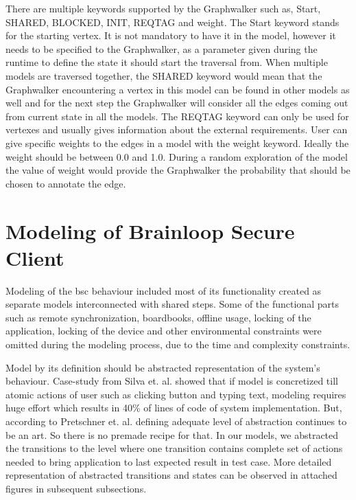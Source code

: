 \par
There are multiple keywords supported by the Graphwalker such as, Start, SHARED, BLOCKED, INIT, REQTAG and weight. The Start keyword stands for the starting vertex. It is not mandatory to have it in the model, however it needs to be specified to the Graphwalker, as a parameter given during the runtime to define the state it should start the traversal from. When multiple models are traversed together, the SHARED keyword would mean that the Graphwalker encountering a vertex in this model can be found in other models as well and for the next step the Graphwalker will consider all the edges coming out from current state in all the models. The REQTAG keyword can only be used for vertexes and usually gives information about the external requirements. User can give specific weights to the edges in a model with the weight keyword. Ideally the weight should be between 0.0 and 1.0. During a random exploration of the model the value of weight would provide the Graphwalker the probability that should be chosen to annotate the edge.

\section{Modeling of Brainloop Secure Client}

\par
Modeling of the \acrshort{bsc} behaviour included  most of its functionality created as separate models interconnected with shared steps. Some of the functional parts such as remote synchronization, boardbooks, offline usage, locking of the application, locking of the device and other environmental constraints were omitted during the modeling process, due to the time and complexity constraints.

\par
Model by its definition should be abstracted representation of the system's behaviour.
Case-study from Silva et. al. \cite{Silva_SpecExplorer} showed that if model is concretized till atomic actions of user such as clicking button and typing text, modeling requires huge effort which results in 40\% of lines of code of system implementation. But, according to Pretschner et. al. \cite{Pretschner_MBTInPractice} defining adequate level of abstraction continues to be an art. So there is no premade recipe for that. In our models, we abstracted the transitions to the level where one transition contains complete set of actions needed to bring application to last expected result in test case. More detailed representation of abstracted transitions and states can be observed in attached figures in subsequent subsections.

